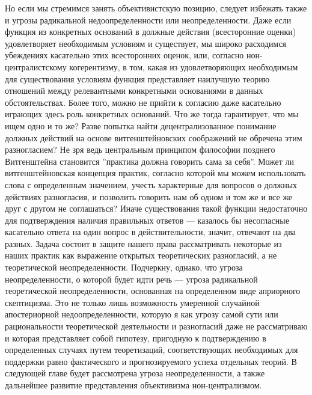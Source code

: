 \documentclass[11pt]{book}
\begin{document}
Но если мы стремимся занять объективистскую позицию, следует избежать также и угрозы радикальной недоопределенности или неопределенности. Даже если функция из конкретных оснований в должные действия (всесторонние оценки) удовлетворяет необходимым условиям и существует, мы широко расходимся убеждениях касательно этих всесторонних оценок, или, согласно нон-централистскому когерентизму, в том, какая из удовлетворяющих необходимым для существования условиям функция представляет наилучшую теорию отношений между релевантными конкретными основаниями в данных обстоятельствах. Более того, можно не прийти к согласию даже касательно играющих здесь роль конкретных оснований. Что же тогда гарантирует, что мы ищем одно и то же? Разве попытка найти децентрализованное понимание должных действий на основе витгенштейновских соображений не обречена этим разногласием? Не зря ведь центральным принципом философии позднего Витгенштейна становится ''практика должна говорить сама за себя''. Может ли витгенштейновская концепция практик, согласно которой мы можем использовать слова с определенным значением, учесть характерные для вопросов о должных действиях разногласия, и позволить говорить нам об одном и том же и все же друг с другом не соглашаться? Иначе существования такой функции недостаточно для подтверждения наличия правильных ответов --- казалось бы несогласные касательно ответа на один вопрос в действительности, значит, отвечают на два разных. Задача состоит в защите нашего права рассматривать некоторые из наших практик как выражение открытых теоретических разногласий, а не теоретической неопределенности. Подчеркну, однако, что угроза неопределенности, о которой будет идти речь --- угроза радикальной теоретической неопределенности, основанная на определенном виде априорного скептицизма. Это не только лишь возможность умеренной случайной апостериорной недоопределенности, которую я как угрозу самой сути или рациональности теоретической деятельности и разногласий даже не рассматриваю и которая представляет собой гипотезу, пригодную к подтверждению в определенных случаях путем теоретизаций, соответствующих необходимых для поддержки равно фактического и прогнозируемого успеха отдельных теорий. В следующей главе будет рассмотрена угроза неопределенности, а также дальнейшее развитие представления объективизма нон-централизмом.
\end{document}
